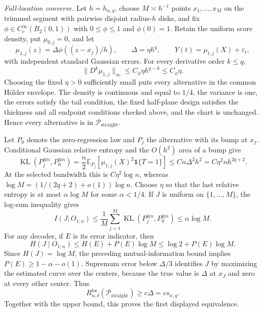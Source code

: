 \emph{Full-location converse.}
Let \(h=h_{n,q}\), choose \(M\asymp h^{-1}\) points \(x_1,\ldots,x_M\) on the trimmed segment with pairwise disjoint radius-\(h\) disks, and fix \(\phi\in C_c^\infty(B_2(0,1))\) with \(0\leq\phi\leq1\) and \(\phi(0)=1\).  Retain the uniform score density, put \(\mu_{0,j}=0\), and let
\[
 \mu_{1,j}(z)=\Delta\phi((z-x_j)/h),
 \qquad \Delta=\eta h^q,
 \qquad Y(t)=\mu_{t,j}(X)+\varepsilon_t,
\]
with independent standard Gaussian errors.  For every derivative order \(k\leq q\),
\[
 \lVert D^k\mu_{1,j}\rVert_\infty
 \leq C_\phi\eta h^{q-k}\leq C_\phi\eta.
\]
Choosing the fixed \(\eta>0\) sufficiently small puts every alternative in the common H\"older envelope.  The density is continuous and equal to \(1/4\), the variance is one, the errors satisfy the tail condition, the fixed half-plane design satisfies the thickness and all endpoint conditions checked above, and the chart is unchanged.  Hence every alternative is in \(\mathcal P_{\mathrm{straight}}\).

Let \(P_0\) denote the zero-regression law and \(P_j\) the alternative with its bump at \(x_j\).  Conditional Gaussian relative entropy and the \(O(h^2)\) area of a bump give
\[
 \operatorname{KL}(P_j^{\otimes n},P_0^{\otimes n})
 =\frac n2\mathbb E_{P_j}
 [\mu_{1,j}(X)^2\mathbf 1\{T=1\}]
 \leq Cn\Delta^2h^2=C\eta^2nh^{2q+2}.
\]
At the selected bandwidth this is \(C\eta^2\log n\), whereas
\(\log M=(1/(2q+2)+o(1))\log n\).  Choose \(\eta\) so that the last relative entropy is at most \(\alpha\log M\) for some \(\alpha<1/4\).  If \(J\) is uniform on \(\{1,\ldots,M\}\), the log-sum inequality gives
\[
 I(J;O_{1:n})\leq\frac1M\sum_{j=1}^M
 \operatorname{KL}(P_j^{\otimes n},P_0^{\otimes n})
 \leq\alpha\log M.
\]
For any decoder, if \(E\) is its error indicator, then
\[
 H(J\mid O_{1:n})\leq H(E)+P(E)\log M
 \leq\log2+P(E)\log M.
\]
Since \(H(J)=\log M\), the preceding mutual-information bound implies \(P(E)\geq1-\alpha-o(1)\).  Supremum error below \(\Delta/3\) identifies \(J\) by maximizing the estimated curve over the centers, because the true value is \(\Delta\) at \(x_J\) and zero at every other center.  Thus
\[
 R_{n,\delta}^{\mathrm{loc}}(\mathcal P_{\mathrm{straight}})
 \geq c\Delta=cs_{n,q}.
\]
Together with the upper bound, this proves the first displayed equivalence.

